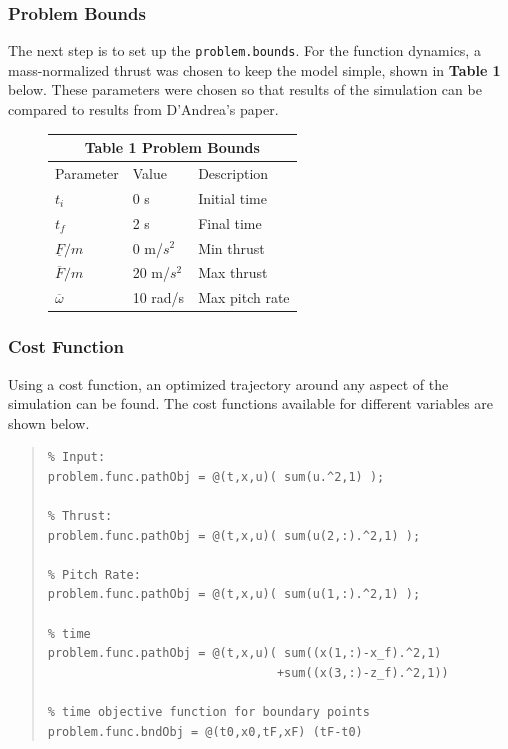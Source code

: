 \documentclass[12pt]{article}
\begin{document}
\subsubsection{Problem Bounds}
The next step is to set up the \lstinline!problem.bounds!. For the function dynamics, a mass-normalized thrust was chosen to keep the model simple, shown in \textbf{Table 1} below. These parameters were chosen so that results of the simulation can be compared to results from D'Andrea's paper\cite{D'Andrea}.
\begin{figure}[H]
\begin{center}
\begin{tabular}{ |p{2.5cm}||p{2cm}||p{3cm}| }
 \hline
 \multicolumn{3}{|c|}{\textbf{Table 1}   Problem Bounds} \\
 \hline
 Parameter & Value & Description\\
 \hline
 $t_{i}$   & 0 s  & Initial time\\
 $t_{f}$  & 2 s  & Final time\\
 $\underline{F}/m$ & 0 m/$s^{2}$ & Min thrust\\
 $\overline{F}/m$ & 20 m/$s^{2}$ & Max thrust\\
 $\overline{\omega}$ & 10 rad/s & Max pitch rate \\
 \hline
\end{tabular}
\end{center}
\end{figure}

\clearpage

\subsubsection{Cost Function}
Using a cost function, an optimized trajectory around any aspect of the simulation can be found. The cost functions available for different variables are shown below. 
\begin{quote}
\begin{lstlisting}
% Input:
problem.func.pathObj = @(t,x,u)( sum(u.^2,1) );

% Thrust:
problem.func.pathObj = @(t,x,u)( sum(u(2,:).^2,1) );

% Pitch Rate:
problem.func.pathObj = @(t,x,u)( sum(u(1,:).^2,1) );

% time
problem.func.pathObj = @(t,x,u)( sum((x(1,:)-x_f).^2,1) 
                                +sum((x(3,:)-z_f).^2,1))

% time objective function for boundary points
problem.func.bndObj = @(t0,x0,tF,xF) (tF-t0)

\end{lstlisting}
\end{quote}
\end{document}
